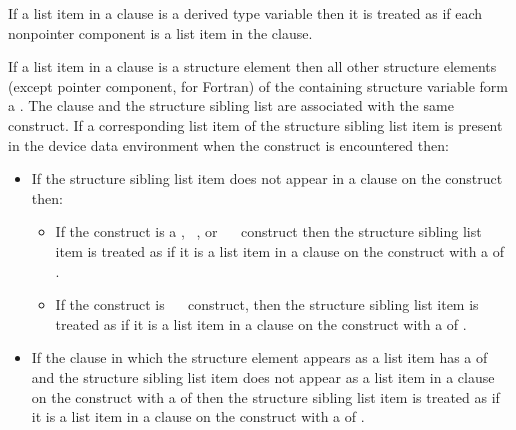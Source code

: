 \begin{fortranspecific}
If a list item in a  clause is a derived type variable
then it is treated as if each nonpointer component is a list item in
the clause.
\end{fortranspecific}

If a list item in a  clause is a structure element then all other
structure elements (except pointer component, for Fortran) of the
containing structure variable form a .  The  clause and the structure sibling list are
associated with the same construct.  If a corresponding list item of the
structure sibling list item is present in the device data environment when the
construct is encountered then:
    \begin{itemize}

    \item If the structure sibling list item does not appear in a 
    clause on the construct then:
    \begin{itemize}

        \item If the construct is a , ~,
        or ~~ construct then the structure
        sibling list item is treated as if it is a list item in a 
        clause on the construct with a  of .

        \item If the construct is ~~
        construct, then the structure sibling list item is treated as if it is
        a list item in a  clause on the construct with a
         of .

    \end{itemize}

    \item If the  clause in which the structure element appears as a
    list item has a  of  and the structure sibling
    list item does not appear as a list item in a  clause on the
    construct with a  of  then the structure sibling
    list item is treated as if it is a list item in a  clause on the
    construct with a  of .

\end{itemize}

